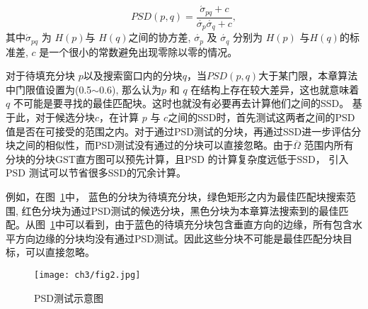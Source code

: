  $$PSD(p,q)=\frac{\acute{\sigma}_{pq}+c}{\acute{\sigma_p}\acute{\sigma_q}+c},$$
其中\(\acute{\sigma}_{pq}\) 为 \(H(p)\)与 \(H(q)\)之间的协方差, \(\acute{\sigma_p}\) 及 \(\acute{\sigma_q}\) 分别为 \(H(p)\) 与\(H(q)\)的标准差, \(c\) 是一个很小的常数避免出现零除以零的情况。\par
 对于待填充分块 \(p\)以及搜索窗口内的分块\(q\)，当\(PSD(p,q)\)大于某门限，本章算法中门限值设置为(0.5\(\sim\)0.6), 那么认为\(p\) 和 \(q\) 在结构上存在较大差异，这也就意味着\(q\) 不可能是要寻找的最佳匹配块。这时也就没有必要再去计算他们之间的SSD。 基于此，对于候选分块\(c\)，在计算 \(p\) 与 \(c\)之间的SSD时，首先测试这两者之间的PSD值是否在可接受的范围之内。对于通过PSD测试的分块，再通过SSD进一步评估分块之间的相似性，而PSD测试没有通过的分块可以直接忽略。由于\(\overline{\Omega}\) 范围内所有分块的分块GST直方图可以预先计算，且PSD 的计算复杂度远低于SSD， 引入PSD 测试可以节省很多SSD的冗余计算。\par
例如，在图~\ref{chap03:fig:PSD}中， 蓝色的分块为待填充分块，绿色矩形之内为最佳匹配块搜索范围, 红色分块为通过PSD测试的候选分块，黑色分块为本章算法搜索到的最佳匹配。从图~\ref{chap03:fig:PSD}中可以看到，由于蓝色的待填充分块包含垂直方向的边缘，所有包含水平方向边缘的分块均没有通过PSD测试。因此这些分块不可能是最佳匹配分块目标，可以直接忽略。
 \begin{figure}[!htbp]
 	\begin{center}
 			\texttt{[image: ch3/fig2.jpg]}
 	\end{center}
     \caption{PSD测试示意图}
 	\label{chap03:fig:PSD}
 \end{figure}


